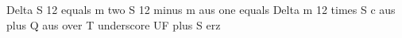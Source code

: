 Delta S 12 equals m two S 12 minus m aus one equals Delta m 12 times S c aus plus Q aus over T underscore UF plus S erz